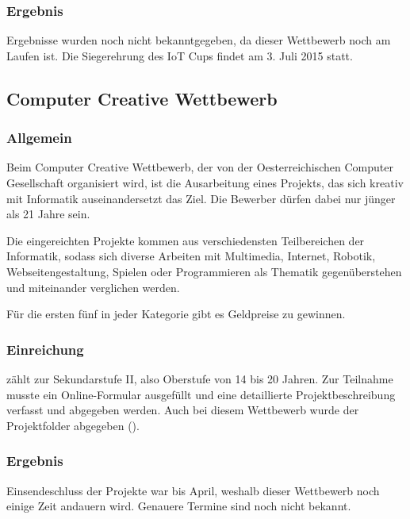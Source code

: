 \subsubsection{Ergebnis}
Ergebnisse wurden noch nicht bekanntgegeben, da dieser Wettbewerb noch am Laufen ist.
Die Siegerehrung des IoT Cups findet am 3. Juli 2015 statt.

\subsection{Computer Creative Wettbewerb}
\subsubsection{Allgemein}
Beim Computer Creative Wettbewerb, der von der Oesterreichischen Computer Gesellschaft
organisiert wird, ist die Ausarbeitung eines Projekts, das sich kreativ mit Informatik
auseinandersetzt das Ziel. Die Bewerber dürfen dabei nur jünger als 21 Jahre sein.

Die eingereichten Projekte kommen aus verschiedensten Teilbereichen der Informatik,
sodass sich diverse Arbeiten mit Multimedia, Internet, Robotik, Webseitengestaltung, Spielen oder
Programmieren als Thematik gegenüberstehen und miteinander verglichen werden.

Für die ersten fünf in jeder Kategorie gibt es Geldpreise zu gewinnen.

\subsubsection{Einreichung}
\sblit zählt zur Sekundarstufe II, also Oberstufe von 14 bis 20 Jahren. Zur Teilnahme
musste ein Online-Formular ausgefüllt und eine detaillierte Projektbeschreibung
verfasst und abgegeben werden. Auch bei diesem Wettbewerb wurde der Projektfolder
abgegeben ().

\subsubsection{Ergebnis}
Einsendeschluss der Projekte war bis April, weshalb dieser Wettbewerb noch einige Zeit
andauern wird. Genauere Termine sind noch nicht bekannt.
